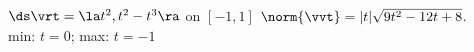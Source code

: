 {$\ds \vrt = \la t^2,t^2-t^3 \ra$ on $[-1,1]$
}
{
$\norm{\vvt} = |t|\sqrt{9t^2-12t+8}$. \\
min: $t=0$; max: $t=-1$
}